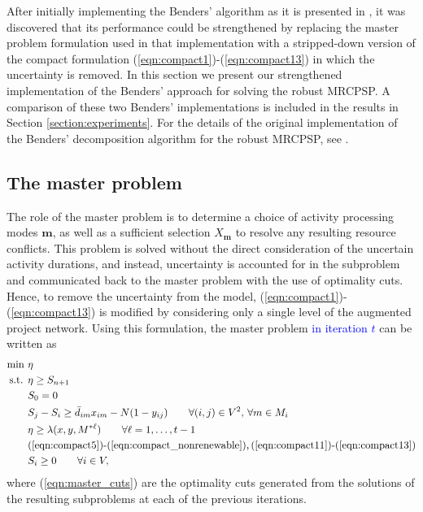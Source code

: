 \documentclass[a4paper,abstracton]{scrartcl}
\newcommand{\marc}[1]{\textcolor{blue}{#1}}
\begin{document}
After initially implementing the Benders' algorithm as it is presented in \cite{balouka2021robust}, it was discovered that its performance could be strengthened by replacing the master problem formulation used in that implementation with a stripped-down version of the compact formulation (\ref{eqn:compact1})-(\ref{eqn:compact13}) in which the uncertainty is removed. In this section we present our strengthened implementation of the Benders' approach for solving the robust MRCPSP. A comparison of these two Benders' implementations is included in the results in Section \ref{section:experiments}. For the details of the original implementation of the Benders' decomposition algorithm for the robust MRCPSP, see \cite{balouka2021robust}.

\subsection{The master problem}

The role of the master problem is to determine a choice of activity processing modes $\bm{m}$, as well as a sufficient selection $X_{\bm{m}}$ to resolve any resulting resource conflicts. This problem is solved without the direct consideration of the uncertain activity durations, and instead, uncertainty is accounted for in the subproblem and communicated back to the master problem with the use of optimality cuts. Hence, to remove the uncertainty from the model, (\ref{eqn:compact1})-(\ref{eqn:compact13}) is modified by considering only a single level of the augmented project network. Using this formulation, the master problem \marc{in iteration $t$} can be written as
\begin{align}
\min \ & \eta\label{eqn:master_first}\\
\text{s.t. } & \eta \geq S_{n+1}\\
	     & S_{0}=0\label{eqn:master2}\\
	     & S_{j} - S_{i} \geq \bar{d}_{im}x_{im} - N(1-y_{ij}) \qquad \forall (i,j)\in V^2,\,\forall m\in M_i\label{eqn:master3}\\
	     & \eta \geq \lambda(x, y, M^{*\ell}) \qquad \forall \ell=1,\dots,t-1\label{eqn:master_cuts}\\
	     & \textnormal{(\ref{eqn:compact5})-(\ref{eqn:compact_nonrenewable}),\,(\ref{eqn:compact11})-(\ref{eqn:compact13})}\\
	     & S_i\geq 0 \qquad \forall i\in V,\label{eqn:master_last}
\end{align}
where (\ref{eqn:master_cuts}) are the optimality cuts generated from the solutions of the resulting subproblems at each of the previous iterations.
\end{document}
